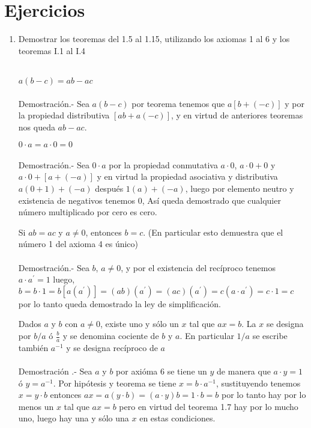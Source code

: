 \section{Ejercicios}
\begin{enumerate}[\bfseries 1.]

\item Demostrar los teoremas del 1.5 al 1.15, utilizando los axiomas 1 al 6 y los teoremas I.1 al I.4\\\\

\begin{teo}
$a(b-c)=ab-ac$\\\\
Demostración.- \; Sea $a(b-c)$ por teorema tenemos que $a\left[ b+(-c)\right]$  y por la propiedad distributiva $\left[ ab + a(-c) \right]$, y en virtud de anteriores teoremas nos queda $ ab - ac $. 
\end{teo}

\begin{teo}
$0\cdot a = a\cdot 0 =0$\\\\
Demostración.- \;
Sea $0\cdot a$ por la propiedad conmutativa $a\cdot 0$, $a\cdot 0 + 0$ y $a\cdot 0 + \left[a+(-a) \right]$ y en virtud la propiedad asociativa y distributiva $a(0 + 1)+(-a)$ después $1(a)+(-a)$, luego por elemento neutro y existencia de negativos tenemos $0$, Así queda demostrado que cualquier número multiplicado por cero es cero.
\end{teo}

\begin{teo} Si $ab=ac$ y $a \neq 0$, entonces $b=c$. (En particular esto demuestra que el número 1 del axioma 4 es único)\\\\
Demostración.- \;
Sea $b$, $a\neq 0$, y por el existencia del recíproco tenemos $a\cdot a^{'}=1 $  luego,  $b=b\cdot 1=b\left[a(a^{'})\right]=(ab)(a^{'})=(ac)(a^{'})=c(a\cdot a^{'})=c\cdot 1=c$ por lo tanto queda demostrado la ley de simplificación.
\end{teo}

\begin{teo} Dados $a$ y $b$ con $a\neq 0$, existe uno y sólo un $x$ tal que $ax=b$. La $x$ se designa por $b/a$ ó $\displaystyle\frac{b}{a}$ y se denomina cociente de $b$ y $a$. En particular $1/a$ se escribe también $a^{-1}$ y se designa recíproco de $a$\\\\
Demostración .- \;
Sea $a$ y $b$ por axióma 6 se tiene un $y$ de manera que $a\cdot y = 1$ ó $y = a^{-1}$. Por hipótesis y teorema se tiene $x=b\cdot a^{-1}$, sustituyendo tenemos $x=y\cdot b$ entonces $ax=a(y\cdot b)=(a\cdot y)b=1\cdot b = b$  por lo tanto hay por lo menos un $x$ tal que $ax=b$ pero en virtud del teorema 1.7 hay por lo mucho uno, luego hay una y sólo una $x$ en estas condiciones.
\end{teo}


\end{enumerate}
